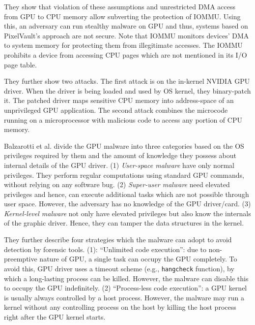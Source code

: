 They show that violation of these assumptions and unrestricted DMA access from GPU to CPU memory allow subverting the protection of IOMMU. Using this, an adversary can run stealthy malware on GPU and thus, systems based on PixelVault's approach are not secure. Note that IOMMU monitors devices' DMA to system memory for protecting them from illegitimate accesses. The IOMMU prohibits a device from accessing CPU pages which are not mentioned in its I/O page table. 
 
They further show two attacks. The first attack is on the in-kernel NVIDIA GPU driver. When the driver is being loaded and used by OS kernel, they binary-patch it. The patched driver maps sensitive CPU memory into address-space of an unprivileged GPU application. The second attack combines the microcode running on a microprocessor with malicious code to access any portion of CPU memory.


Balzarotti et al. \cite{balzarotti2015impact} divide the GPU malware into three categories based on the OS privileges required by them and the amount of knowledge they possess about internal details of the GPU driver. (1) \textit{User-space malware} have only normal privileges. They perform regular computations using standard GPU commands, without relying on any software bug. (2) \textit{Super-user malware} need elevated privileges and hence, can execute additional tasks which are not possible through user space. However, the adversary has no knowledge of the GPU driver/card. (3) \textit{Kernel-level malware} not only have elevated privileges but also know the internals of the graphic driver. Hence, they can tamper the data structures in the kernel.    
   

They further describe four strategies which the malware can adopt to avoid detection by forensic tools. (1): ``Unlimited code execution'': due to non-preemptive nature of GPU, a single task can occupy the GPU completely. To avoid this, GPU driver uses a timeout scheme (e.g.,  {\tt hangcheck} function), by which a long-lasting process can be killed. However, the malware can disable this to occupy the GPU indefinitely. (2) ``Process-less code execution'': a GPU kernel is usually always controlled by a host process. However, the malware may run a kernel without any controlling process on the host  by killing the host process right after the GPU kernel starts. 
 

